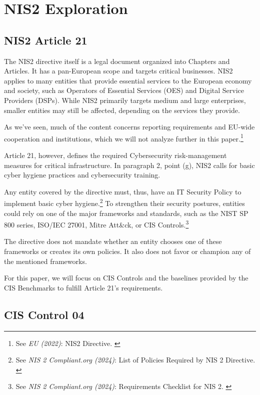 %
%

\pagebreak
\section{NIS2 Exploration}

\onehalfspacing

\subsection{NIS2 Article 21}

The NIS2 directive itself is a legal document organized into Chapters and Articles. It has a pan-European scope and targets critical businesses. NIS2 applies to many entities that provide essential services to the European economy and society, such as Operators of Essential Services (OES) and Digital Service Providers (DSPs). While NIS2 primarily targets medium and large enterprises, smaller entities may still be affected, depending on the services they provide.

As we've seen, much of the content concerns reporting requirements and EU-wide cooperation and institutions, which we will not analyze further in this paper.\footnote{See \textit{EU (2022)}: NIS2 Directive. \cite{nis2}}

Article 21, however, defines the required Cybersecurity risk-management measures for critical infrastructure. In paragraph 2, point (g), NIS2 calls for basic cyber hygiene practices and cybersecurity training.

Any entity covered by the directive must, thus, have an IT Security Policy to implement basic cyber hygiene.\footnote{See \textit{NIS 2 Compliant.org (2024)}: List of Policies Required by NIS 2 Directive. \cite{nisPols}} To strengthen their security postures, entities could rely on one of the major frameworks and standards, such as the NIST SP 800 series, ISO/IEC 27001, Mitre Att\&ck, or CIS Controls.\footnote{See \textit{NIS 2 Compliant.org (2024)}: Requirements Checklist for NIS 2. \cite{nisReqs}}

The directive does not mandate whether an entity chooses one of these frameworks or creates its own policies. It also does not favor or champion any of the mentioned frameworks.

For this paper, we will focus on CIS Controls and the baselines provided by the CIS Benchmarks to fulfill Article 21's requirements.

\subsection{CIS Control 04}

